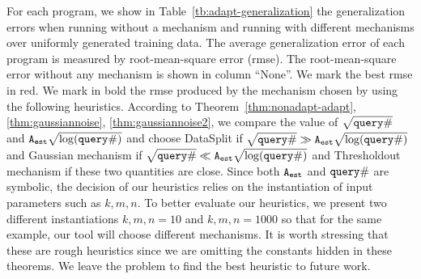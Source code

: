 For each program, we show in Table~\ref{tb:adapt-generalization} the
generalization errors when running without a mechanism and running
with different mechanisms over uniformly generated training data.  The
average generalization error of each program is measured by
root-mean-square error (rmse).  The root-mean-square error without any
mechanism is shown in column ``None''. 
We mark the best rmse in red.
We mark in bold the rmse
produced by the mechanism chosen by {\THESYSTEM} using the following
heuristics.  According to Theorem~\ref{thm:nonadapt-adapt},\ref{thm:gaussiannoise},
\ref{thm:gaussiannoise2},
we compare the value of $\sqrt{{\tt query} \#}$ and
${\mathtt{A_{est}}}\sqrt{\log({\tt query} \#)}$ and choose DataSplit if
$\sqrt{{\tt query} \#} \gg {\ensuremath{\mathtt{A_{est}}}}\sqrt{\log({\tt query} \#)}$ and Gaussian
mechanism if $\sqrt{{\tt query} \#} \ll {\ensuremath{\mathtt{A_{est}}}}\sqrt{\log({\tt query} \#)}$ and
Thresholdout mechanism if these two quantities are close. 
Since both ${\mathtt{A_{est}}}$ and ${\tt query} \#$ are symbolic, the decision of our heuristics relies on 
    the instantiation of input parameters such as $k,m, n$. To better evaluate our heuristics, 
    we present two different instantiations $k,m,n=10$ and $k,m, n =1000$ so that
    for the same example, our tool will choose different mechanisms.
 It is worth
stressing that these are rough heuristics since we are omitting the
constants hidden in these theorems. We leave the problem to find
the best heuristic to future work.



